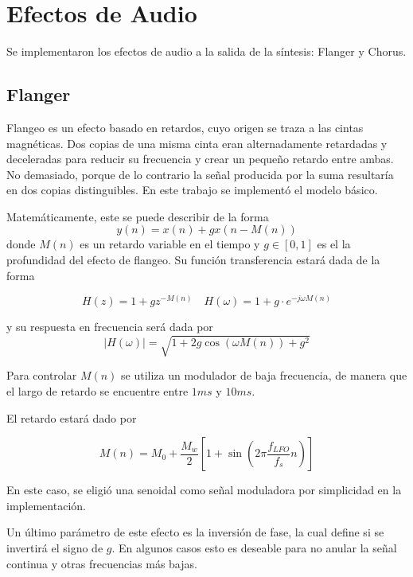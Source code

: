 \chapter{Efectos de Audio}

Se implementaron los efectos de audio a la salida de la síntesis: Flanger y Chorus.

\section{Flanger}

Flangeo es un efecto basado en retardos, cuyo origen se traza a las cintas magnéticas. Dos copias de una misma cinta eran alternadamente retardadas y deceleradas para reducir su frecuencia y crear un pequeño retardo entre ambas. No demasiado, porque de lo contrario la señal producida por la suma resultaría en dos copias distinguibles. En este trabajo se implementó el modelo básico.

Matemáticamente, este se puede describir de la forma
\begin{equation}
    y(n)=x(n) + g x(n-M(n))
\end{equation}
donde $M(n)$ es un retardo variable en el tiempo y $g\in [0,1]$ es el la profundidad del efecto de flangeo. Su función transferencia estará dada de la forma

\begin{equation}
    H(z)=1+gz^{-M(n)}\quad H(\omega)=1+g \cdot e^{-j\omega M(n)}
\end{equation}

y su respuesta en frecuencia será dada por
\begin{equation}
    |H(\omega)|=\sqrt{1+2g\cos(\omega M(n))+g^2}
\end{equation}

Para controlar $M(n)$ se utiliza un modulador de baja frecuencia, de manera que el largo de retardo se encuentre entre $1 ms$ y $10 ms$.

El retardo estará dado por

\begin{equation*}
    M(n)=M_0 + \frac{M_w}{2} \left[1+\sin\left(2\pi \frac{f_{LFO}}{f_s} n\right)\right]
\end{equation*}

En este caso, se eligió una senoidal como señal moduladora por simplicidad en la implementación.

Un último parámetro de este efecto es la inversión de fase, la cual define si se invertirá el signo de $g$. En algunos casos esto es deseable para no anular la señal continua y otras frecuencias más bajas.

